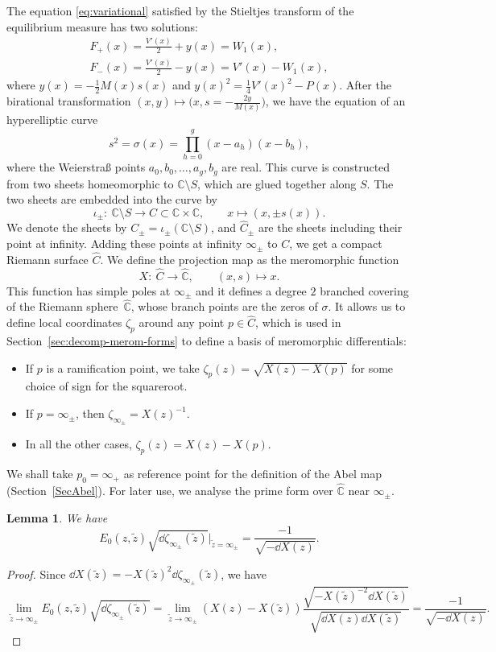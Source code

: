 \documentclass[10pt,a4paper]{amsart}
\numberwithin{equation}{section}
\newtheorem{Lemma}[Theorem]{Lemma}
\newcommand{\CC}{\mathbb{C}}
\newcommand{\C}{\mathbb{C}}
\begin{document}
The equation \eqref{eq:variational} satisfied by the Stieltjes transform of the equilibrium measure has two solutions:
\begin{gather}
\nonumber
 F_{+}(x) = \frac{V'(x)}{2} + y(x) = W_{1}(x),\\
 F_{-}(x) = \frac{V'(x)}{2} - y(x) = V'(x) - W_{1}(x),\label{Fpm}
\end{gather}
where $y(x) = -\frac{1}{2}M(x)s(x)$ and $y(x)^2 = \frac{1}{4}V'(x)^2 - P(x)$. After the birational transformation $(x,y) \mapsto \bigl(x,s = -\frac{2y}{M(x)}\bigr)$, we have the equation of an hyperelliptic curve
\[
 s^{2} = \sigma(x) = \prod_{h = 0}^{g} (x - a_h)(x - b_h),
\]
where the Weierstra\ss{} points $a_0,b_0,\ldots,a_g,b_g$ are real. This curve is constructed from two sheets homeomorphic to
$\CC\setminus S$, which are glued together along $S$. The two sheets are embedded into the curve
by
\[
 \iota_{\pm }\colon \   \CC \setminus S   \longrightarrow   C \subset \CC \times \CC,\qquad  x   \longmapsto   (x,\pm s(x))  .
\]
We denote the sheets by $C_{\pm} = \iota_{\pm}(\C \setminus S)$, and $\widehat{C}_{\pm}$ are the sheets including their point at infinity. Adding these points at infinity $\infty_{\pm}$ to $C$, we get a compact Riemann surface $\widehat{C}$. We define the projection map as the meromorphic function
\[
 X \colon \  \widehat{C}   \longrightarrow   \widehat{\mathbb{C}},\qquad (x, s)   \longmapsto   x .
\]
This function has simple poles at $\infty_{\pm}$ and it defines a degree $2$ branched covering of the Riemann sphere~$\hat{\CC}$, whose branch points are the zeros of $\sigma$. It allows us to define local coordinates $\zeta_{p}$ around any point $p \in \widehat{C}$, which is used in Section~\ref{sec:decomp-merom-forms} to define a basis of meromorphic differentials:
\begin{itemize}\itemsep=0pt
 \item If $p$ is a ramification point, we take $\zeta_{p}(z) = \sqrt{X(z) - X(p)}$ for some choice of sign for the squareroot.
 \item If $p = \infty_{\pm}$, then $\zeta_{\infty_{\pm}} = X(z)^{-1}$.
 \item In all the other cases, $\zeta_{p}(z) = X(z) - X(p)$.
\end{itemize}
We shall take $p_0 = \infty_+$ as reference point for the definition of the Abel map (Section~\ref{SecAbel}). For later use, we analyse the prime form over $\widehat{\mathbb{C}}$ near $\infty_{\pm}$.
\begin{Lemma}
\label{LemE0in}We have
\[
E_0(z,\tilde{z})\sqrt{\dd \zeta_{\infty_\pm}(\tilde{z})}\Big|_{\tilde{z} = \infty_\pm} = \frac{-1}{\sqrt{-\dd X(z)}}.
\]
\end{Lemma}
\begin{proof}
Since $\dd X(\tilde{z}) = -X(\tilde{z})^2 \dd\zeta_{\infty_\pm}(\tilde{z})$, we have
\[
\lim_{\tilde{z} \rightarrow \infty_\pm} E_0(z,\tilde{z})\sqrt{\dd \zeta_{\infty_\pm}(\tilde{z})} = \lim_{\tilde{z} \rightarrow \infty_\pm} (X(z) - X(\tilde{z})) \frac{\sqrt{-X(\tilde{z})^{-2}\dd X(\tilde{z})}}{\sqrt{\dd X(z)\dd X(\tilde{z})}} = \frac{-1}{\sqrt{-\dd X(z)}}.
\tag*{\qed}
\]
\renewcommand{\qed}{}
\end{proof}
\end{document}
